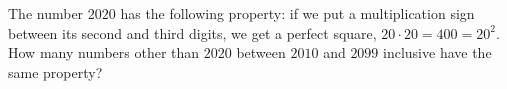 The number $2020$ has the following property: if we put a multiplication sign between its second and third digits, we get a perfect square, $20\cdot20=400=20^2$. How many numbers other than $2020$ between $2010$ and $2099$ inclusive have the same property?
